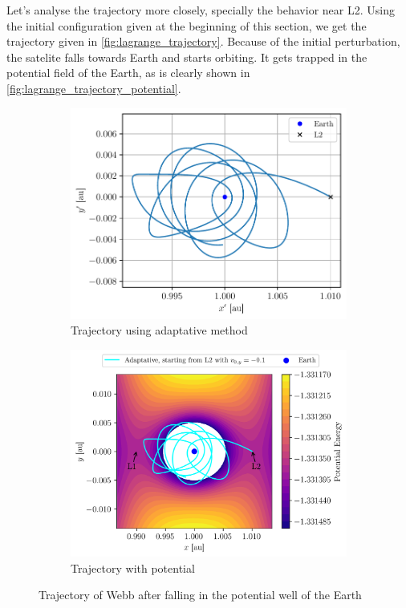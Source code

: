 Let's analyse the trajectory more closely, specially the behavior near L2. Using the initial configuration given at the beginning of this section, we get the trajectory given in \autoref{fig:lagrange_trajectory}. Because of the initial perturbation, the satelite falls towards Earth and starts orbiting. It gets trapped in the potential field of the Earth, as is clearly shown in \autoref{fig:lagrange_trajectory_potential}.

\begin{figure}[h]
    \centering
    \begin{subfigure}{0.48\linewidth}
        \centering
        \includegraphics[width=\linewidth]{figures/lagrange_trajectory.pdf}
        \caption{Trajectory using adaptative method}
        \label{fig:lagrange_trajectory}
    \end{subfigure}
    \begin{subfigure}{0.48\linewidth}
        \centering
        \includegraphics[width=\linewidth]{figures/potential_L1_L2_zoom_trajectory.png}
        \caption{Trajectory with potential}
        \label{fig:lagrange_trajectory_potential}
    \end{subfigure}
    \caption{Trajectory of Webb after falling in the potential well of the Earth}
\end{figure}

